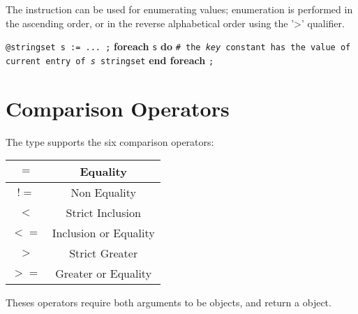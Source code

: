 The  instruction can be used for enumerating  values; enumeration is performed in the ascending order, or in the reverse alphabetical order using the '>' qualifier.

\texttt{@stringset s := ... ;}\newline
\textbf{foreach} \texttt {s} \textbf {do}\newline
\texttt{\# the \emph{key} constant has the value of current entry of \emph{s} stringset}\newline
\textbf{end foreach} \texttt{;}







\section{Comparison Operators}

The  type supports the six comparison operators:\newline

\begin{tabular}{|c|c|}
\hline
$=$ & Equality \\
\hline
$!=$ & Non Equality \\
\hline
$<$  & Strict Inclusion \\
\hline
$<=$  & Inclusion or Equality \\
\hline
$>$  & Strict Greater \\
\hline
$>=$  & Greater or Equality \\
\hline
\end{tabular}

Theses operators require both arguments to be  objects, and return a  object.


